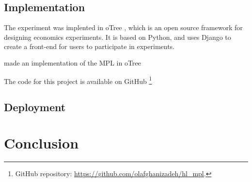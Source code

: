 \documentclass [12pt,a4paper,oneside]{article}
\begin{document}
\subsection{Implementation}
The experiment was implented in oTree \textcite{chen_otreeopen-source_2016}, which is an open source framework for designing economics experiments. It is based on Python, and uses Django to create a front-end for users to participate in experiments. 

\textcite{holzmeister_otree_2017} made an implementation of the \textcite{holt_risk_2002} MPL in oTree

The code for this project is available on GitHub \footnote{GitHub repository: \url{https://github.com/olafghanizadeh/hl_mpl}.}

\subsection{Deployment}


 

\newpage 
\section{Conclusion}




\printbibliography
\end{document}
